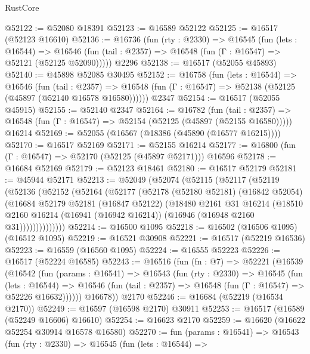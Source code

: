 \begin{lexlean}{RustCore}
\begin{coremodule}
@52122 := @52080 @18391
@52123 := @16589 @52122
@52125 := @16517 (@52123 @16610)
@52136 := @16736
    (fun (rty : @2330) =>
    @16545
      (fun (lets : @16544) =>
      @16546 (fun (tail : @2357) => @16548 (fun (Γ : @16547) => @52121 (@52125 @52090)))))
    @2296
@52138 := @16517 (@52055 @45893)
@52140 := @45898 @52085 @30495
@52152 := @16758
    (fun (lets : @16544) =>
    @16546
      (fun (tail : @2357) =>
      @16548 (fun (Γ : @16547) => @52138 (@52125 (@45897 (@52140 @16578 @16580))))))
    @2347
@52154 := @16517 (@52055 @45915)
@52155 := @52140 @2347
@52164 := @16782
    (fun (tail : @2357) => @16548 (fun (Γ : @16547) => @52154 (@52125 (@45897 (@52155 @16580)))))
    @16214
@52169 := @52055 (@16567 (@18386 (@45890 (@16577 @16215))))
@52170 := @16517 @52169
@52171 := @52155 @16214
@52177 := @16800 (fun (Γ : @16547) => @52170 (@52125 (@45897 @52171))) @16596
@52178 := @16684 @52169
@52179 := @52123 @18461
@52180 := @16517 @52179
@52181 := @45944 @52171
@52213 := @52049
    (@52074
      (@52115
        (@52117
          (@52119
            (@52136
              (@52152
                (@52164
                  (@52177
                    (@52178
                      (@52180 @52181)
                      (@16842 @52054)
                      (@16684
                        @52179
                        @52181
                        (@16847 @52122)
                        (@18480
                          @2161
                          @31
                          @16214
                          (@18510
                            @2160
                            @16214
                            (@16941 (@16942 @16214))
                            (@16946 (@16948 @2160 @31))))))))))))))
@52214 := @16500 @1095
@52218 := @16502 (@16506 @1095) (@16512 @1095)
@52219 := @16521 @30908
@52221 := @16517 (@52219 @16536)
@52223 := @16559 (@16560 @1095)
@52224 := @16555 @52223
@52226 := @16517 (@52224 @16585)
@52243 := @16516
    (fun (fn : @7) =>
    @52221
      (@16539
        (@16542
          (fun (params : @16541) =>
          @16543
            (fun (rty : @2330) =>
            @16545
              (fun (lets : @16544) =>
              @16546 (fun (tail : @2357) => @16548 (fun (Γ : @16547) => @52226 @16632))))))
        @16678))
    @2170
@52246 := @16684 (@52219 (@16534 @2170))
@52249 := @16597 (@16598 @2170) @30911
@52253 := @16517 (@16589 (@52249 @16606) @16610)
@52254 := @16623 @2170
@52259 := @16620 (@16622 @52254 @30914 @16578 @16580)
@52270 := fun (params : @16541) =>
  @16543
    (fun (rty : @2330) =>
    @16545
      (fun (lets : @16544) =>

\end{coremodule}
\end{lexlean}

